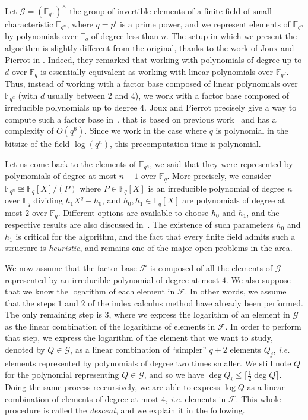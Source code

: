 \documentclass[a4paper,11pt]{article}
\theoremstyle{break}
\theoremstyle{sc}
\theoremstyle{definition}
\theoremstyle{remark}
\newcommand{\ie}{\emph{i.e. }}
\begin{document}
Let $\mathcal G = (\mathbb{F}_{q^n})^\times$ the group of invertible elements of a finite
field of small characteristic $\mathbb{F}_{q^n}$, where $q=p^l$ is a prime
power, and we represent elements of $\mathbb{F}_{q^n}$ by polynomials over
$\mathbb{F}_q$ of degree less than $n$. The setup in which we present the algorithm is slightly different from
the original, thanks to the work of Joux and Pierrot in \cite{JP14}. Indeed,
they remarked that working with polynomials of degree up to $d$ over $\mathbb{F}_q$ is
essentially equivalent as working with linear polynomials over $\mathbb{F}_{q^d}$. Thus,
instead of working with a factor base composed of linear polynomials over
$\mathbb{F}_{q^d}$ (with $d$ usually between $2$ and $4$), we work with a
factor base composed of irreducible polynomials up to degree $4$. Joux and Pierrot
precisely give a way to compute such a factor base in~\cite{JP14}, that is based
on previous work~\cite{Joux13, BGJT13} and has a complexity of $O(q^6)$. Since
we work in the case where $q$ is polynomial in the bitsize of the field
$\log(q^n)$, this precomputation time is polynomial.

Let us come back to the elements of $\mathbb{F}_{q^n}$, we said that they were
represented by polymomials of degree at most $n-1$ over $\mathbb{F}_q$. More
precisely, we consider $\mathbb{F}_{q^n}\cong \mathbb{F}_{q}[X]/(P)$ where $P\in
\mathbb{F}_{q}[X]$ is an irreducible polynomial of degree $n$ over
$\mathbb{F}_{q}$ dividing $h_1X^q-h_0$, and $h_0, h_1\in \mathbb{F}_q[X]$ are
polynomials of degree at most $2$ over $\mathbb{F}_q$. Different options are
available to choose $h_0$ and $h_1$, and the respective results are also
discussed in~\cite{JP14}. The existence of such parameters $h_0$ and $h_1$ is
critical for the algorithm, and the fact that every finite field admits such a
structure is \emph{heuristic}, and remains one of the major open problems in the
area.

We now assume that the factor base $\mathcal F$ is composed of all the
elements of $\mathcal G$ represented by an irreducible polynomial of degree at
most $4$. We also suppose that we know the logarithm of each element in
$\mathcal F$. In other words, we assume that the steps $1$ and $2$ of the index
calculus method have already been performed. The only remaining step is $3$,
where we express the logarithm of an element in $\mathcal G$ as the linear
combination of the logarithms of elements in $\mathcal F$. In order to perform
that step, we express the logarithm of the element that we want to study, denoted by
$Q\in\mathcal G$, as a linear combination of ``simpler'' $q+2$ elements $Q_j$,
\ie elements represented by polynomials of degree two times smaller. We
still note $Q$ for the polynomial representing $Q\in
\mathcal G$, and so we have $\deg Q_i\leq \lceil \frac{1}{2}\deg Q\rceil$. Doing
the same process reccursively, we are able to express $\log Q$ as a linear
combination of elements of degree at most $4$, \ie elements in $\mathcal F$.
This whole procedure is called the \emph{descent}, and we explain it in the
following. 
\end{document}
